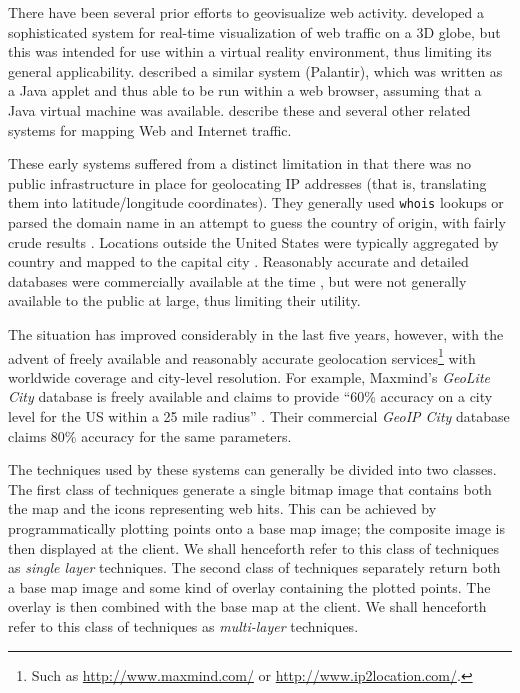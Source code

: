\documentclass[acmtocl,acmnow]{acmtrans2m}
\begin{document}
There have been several prior efforts to geovisualize web activity.
 developed a sophisticated system for
real-time visualization of web traffic on a 3D globe, but this was
intended for use within a virtual reality environment, thus limiting its
general applicability.  described a similar
system (Palantir), which was written as a Java applet and thus able to
be run within a web browser, assuming that a Java virtual machine was
available.  describe these
and several other related systems for mapping Web and Internet traffic.

These early systems suffered from a distinct limitation in that there
was no public infrastructure in place for geolocating IP addresses (that
is, translating them into latitude/longitude coordinates). They
generally used \texttt{whois} lookups or parsed the domain name in an
attempt to guess the country of origin, with fairly crude results
\cite{Lamm-SE-1996-webvis}. Locations outside the United States were
typically aggregated by country and mapped to the capital city
\cite{Lamm-SE-1996-webvis,Papa-N-1998-Palantir,Jian-B-2000-cybermap}.
Reasonably accurate and detailed databases were commercially available
at the time \cite[p.\ 1466]{Lamm-SE-1996-webvis}, but were not generally
available to the public at large, thus limiting their utility.

The situation has improved considerably in the last five years, however,
with the advent of freely available and reasonably accurate geolocation
services\footnote{Such as \url{http://www.maxmind.com/} or
\url{http://www.ip2location.com/}.} with worldwide coverage and
city-level resolution. For example, Maxmind's \emph{GeoLite City}
database is freely available and claims to provide ``60\% accuracy on a
city level for the US within a 25 mile radius''
\cite{Maxm-G-2006-GeoLiteCity}. Their commercial \emph{GeoIP City}
database claims 80\% accuracy for the same parameters.

The techniques used by these systems can generally be divided into two
classes. The first class of techniques generate a single bitmap image
that contains both the map and the icons representing web hits. This can
be achieved by programmatically plotting points onto a base map image;
the composite image is then displayed at the client. We shall henceforth
refer to this class of techniques as \emph{single layer} techniques.
The second class of techniques separately return both a base map image
and some kind of overlay containing the plotted points. The overlay is
then combined with the base map at the client. We shall henceforth refer
to this class of techniques as \emph{multi-layer} techniques.
\end{document}
